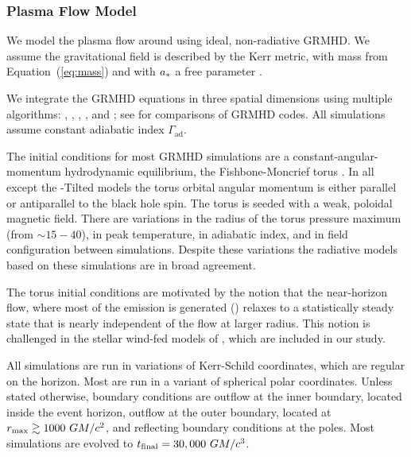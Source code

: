 \subsubsection{Plasma Flow Model}

We model the plasma flow around \sgra using ideal, non-radiative GRMHD.  We assume the gravitational field
is described by the Kerr metric, with mass from Equation~(\ref{eq:mass}) and with $a_*$ a free parameter \citep[see e.g.,][]{1999ApJ...522..727K,2003ApJ...589..444G, 2003ApJ...589..458D, 2005ApJ...635..723A, 2007A&A...473...11D}.

We integrate the GRMHD equations in three spatial dimensions using multiple algorithms:
\kharma   \citep{2021JOSS....6.3336P},
\bhac     \citep{2017ComAC...4....1P},
\hamr     \citep{Liska2019},
\koral    \citep{2013MNRAS.429.3533S}, and
\athenapp \citep{2016ApJS..225...22W};
see \citet{2019ApJS..243...26P} for comparisons of GRMHD codes.
All simulations assume constant adiabatic index  $\Gamma_\mathrm{ad}$.

The initial conditions for most GRMHD simulations  are a constant-angular-momentum hydrodynamic equilibrium, the Fishbone-Moncrief torus \citep{1976ApJ...207..962F}.  In all except the \hamr-Tilted models the torus orbital angular momentum is either parallel or antiparallel to the black hole spin.  The torus is seeded with a weak, poloidal magnetic field.  There are variations in the radius of the torus pressure maximum (from $\sim 15-40$), in peak temperature, in  adiabatic index, and in field configuration between simulations.  Despite these variations the radiative models based on these simulations are in broad agreement.   

The torus initial conditions are motivated by the notion that the near-horizon flow, where most of the emission is generated () relaxes to a statistically steady state that is nearly independent of the flow at larger radius.  This notion is challenged in the stellar wind-fed models of \cite{2020ApJ...896L...6R}, which are included in our study.

All simulations are run in variations of Kerr-Schild coordinates, which are regular on the horizon.
Most are run in a variant of spherical polar coordinates.
Unless stated otherwise, boundary conditions are outflow at the inner boundary, located inside the event horizon, outflow at the outer boundary, located at $r_{\rm max} \gtrsim 1000~GM/c^2$, and reflecting boundary conditions at the poles.
Most simulations are evolved to $t_\mathrm{final} = 30,000~GM/c^3$.

